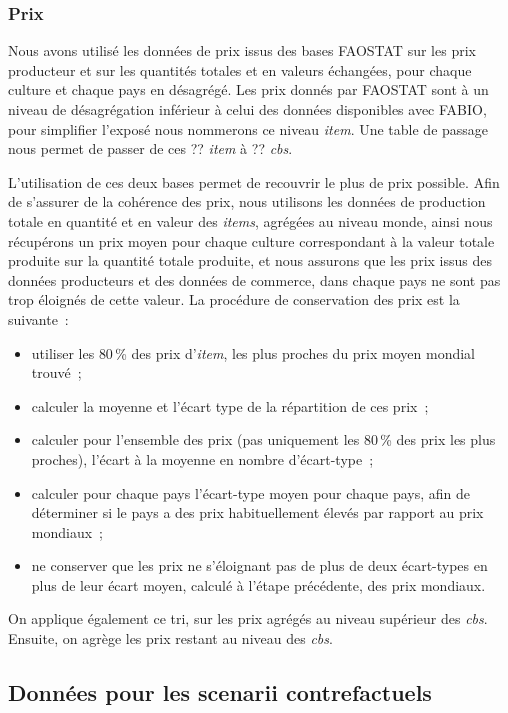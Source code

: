 \subsubsection{Prix}
Nous avons utilisé les données de prix issus des bases FAOSTAT sur les prix producteur et sur les quantités totales et en valeurs échangées, pour chaque culture et chaque pays en désagrégé. Les prix donnés par FAOSTAT sont à un niveau de désagrégation inférieur à celui des données disponibles avec FABIO, pour simplifier l'exposé nous nommerons ce niveau \textit{item}. Une table de passage nous permet de passer de ces ?? \textit{item} à ?? \textit{cbs}.

L'utilisation de ces deux bases permet de recouvrir le plus de prix possible. Afin de s'assurer de la cohérence des prix, nous utilisons les données de production totale en quantité et en valeur des \textit{items}, agrégées au niveau monde, ainsi nous récupérons un prix moyen pour chaque culture correspondant à la valeur totale produite sur la quantité totale produite, et nous assurons que les prix issus des données producteurs et des données de commerce, dans chaque pays ne sont pas trop éloignés de cette valeur. La procédure de conservation des prix est la suivante~:
\begin{itemize}
    \item utiliser les {80\,\%} des prix d'\textit{item}, les plus proches du prix moyen mondial trouvé~;
    \item calculer la moyenne et l'écart type de la répartition de ces prix~;
    \item calculer pour l'ensemble des prix (pas uniquement les 80\,\% des prix les plus proches), l'écart à la moyenne en nombre d’écart-type~;
    \item calculer pour chaque pays l'écart-type moyen pour chaque pays, afin de déterminer si le pays a des prix habituellement élevés par rapport au prix mondiaux~;
    \item ne conserver que les prix ne s'éloignant pas de plus de deux écart-types en plus de leur écart moyen, calculé à l'étape précédente, des prix mondiaux.
\end{itemize}
On applique également ce tri, sur les prix agrégés au niveau supérieur des \textit{cbs}. Ensuite, on agrège les prix restant au niveau des \textit{cbs}.


\subsection{Données pour les scenarii contrefactuels}

